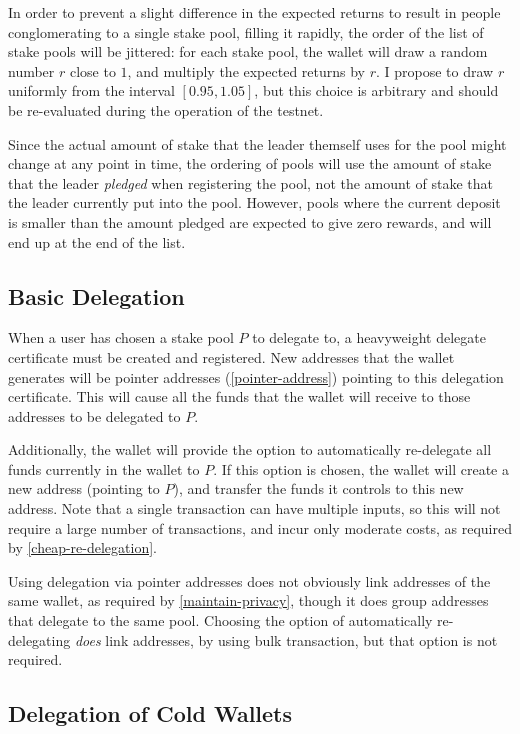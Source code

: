 \documentclass[11pt,a4paper]{article}
\begin{document}
In order to prevent a slight difference in the expected returns to
result in people conglomerating to a single stake pool, filling it
rapidly, the order of the list of stake pools will be jittered: for each
stake pool, the wallet will draw a random number \(r\) close to \(1\),
and multiply the expected returns by \(r\). I propose to draw \(r\)
uniformly from the interval \([0.95, 1.05]\), but this choice is
arbitrary and should be re-evaluated during the operation of the
testnet.

Since the actual amount of stake that the leader themself uses for the
pool might change at any point in time, the ordering of pools will use
the amount of stake that the leader \emph{pledged} when registering the
pool, not the amount of stake that the leader currently put into the
pool. However, pools where the current deposit is smaller than the
amount pledged are expected to give zero rewards, and will end up at the
end of the list.

\subsection{Basic Delegation}\label{basic-delegation}

When a user has chosen a stake pool \(P\) to delegate to, a heavyweight
delegate certificate must be created and registered. New addresses that
the wallet generates will be pointer addresses (\ref{pointer-address})
pointing to this delegation certificate. This will cause all the funds
that the wallet will receive to those addresses to be delegated to
\(P\).

Additionally, the wallet will provide the option to automatically
re-delegate all funds currently in the wallet to \(P\). If this option
is chosen, the wallet will create a new address (pointing to \(P\)), and
transfer the funds it controls to this new address. Note that a single
transaction can have multiple inputs, so this will not require a large
number of transactions, and incur only moderate costs, as required by
\ref{cheap-re-delegation}.

Using delegation via pointer addresses does not obviously link addresses
of the same wallet, as required by \ref{maintain-privacy}, though it
does group addresses that delegate to the same pool. Choosing the option
of automatically re-delegating \emph{does} link addresses, by using bulk
transaction, but that option is not required.

\subsection{Delegation of Cold
Wallets}\label{delegation-of-cold-wallets}
\end{document}
